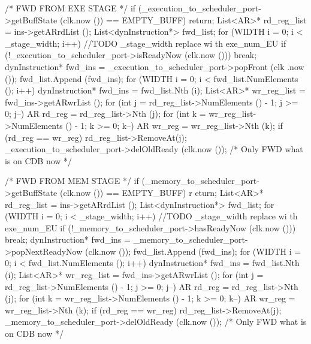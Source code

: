 \begin{DoxyCode}
                                                                  {
    { /* FWD FROM EXE STAGE */
        if (_execution_to_scheduler_port->getBuffState (clk.now ()) == 
      EMPTY_BUFF) return;
        List<AR>* rd_reg_list = ins->getARrdList ();
        List<dynInstruction*> fwd_list;
        for (WIDTH i = 0; i < _stage_width; i++) { //TODO _stage_width replace wi
      th exe_num_EU
            if (!_execution_to_scheduler_port->isReadyNow (clk.now ())) break;
            dynInstruction* fwd_ins = _execution_to_scheduler_port->popFront (clk
      .now ());
            fwd_list.Append (fwd_ins);
        }
        for (WIDTH i = 0; i < fwd_list.NumElements (); i++) {
            dynInstruction* fwd_ins = fwd_list.Nth (i);
            List<AR>* wr_reg_list = fwd_ins->getARwrList ();
            for (int j = rd_reg_list->NumElements () - 1; j >= 0; j--) {
                AR rd_reg = rd_reg_list->Nth (j);
                for (int k = wr_reg_list->NumElements () - 1; k >= 0; k--) {
                    AR wr_reg = wr_reg_list->Nth (k);
                    if (rd_reg == wr_reg) {
                        rd_reg_list->RemoveAt(j);
                    }
                }
            }
        }
        _execution_to_scheduler_port->delOldReady (clk.now ()); /* Only FWD what 
      is on CDB now */
    }

    { /* FWD FROM MEM STAGE */
        if (_memory_to_scheduler_port->getBuffState (clk.now ()) == EMPTY_BUFF) r
      eturn;
        List<AR>* rd_reg_list = ins->getARrdList ();
        List<dynInstruction*> fwd_list;
        for (WIDTH i = 0; i < _stage_width; i++) { //TODO _stage_width replace wi
      th exe_num_EU
            if (!_memory_to_scheduler_port->hasReadyNow (clk.now ())) break;
            dynInstruction* fwd_ins = _memory_to_scheduler_port->popNextReadyNow 
      (clk.now ());
            fwd_list.Append (fwd_ins);
        }
        for (WIDTH i = 0; i < fwd_list.NumElements (); i++) {
            dynInstruction* fwd_ins = fwd_list.Nth (i);
            List<AR>* wr_reg_list = fwd_ins->getARwrList ();
            for (int j = rd_reg_list->NumElements () - 1; j >= 0; j--) {
                AR rd_reg = rd_reg_list->Nth (j);
                for (int k = wr_reg_list->NumElements () - 1; k >= 0; k--) {
                    AR wr_reg = wr_reg_list->Nth (k);
                    if (rd_reg == wr_reg) {
                        rd_reg_list->RemoveAt(j);
                    }
                }
            }
        }
        _memory_to_scheduler_port->delOldReady (clk.now ()); /* Only FWD what is 
      on CDB now */
    }
}
\end{DoxyCode}
